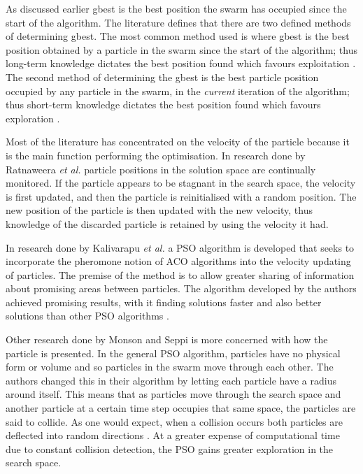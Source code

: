 As discussed earlier gbest is the best position the swarm has occupied since the start of the algorithm. The literature defines that there are two defined methods of determining gbest. The most common method used is where gbest is the best position obtained by a particle in the swarm since the start of the algorithm; thus long-term knowledge dictates the best position found which favours exploitation \cite{CompuIntelligenceIntro,FundamentalSwarm}.
The second method of determining the gbest is the best particle position occupied by any particle in the swarm, in the \emph{current} iteration of the algorithm; thus short-term knowledge dictates the best position found which favours exploration \cite{CompuIntelligenceIntro,FundamentalSwarm}.

Most of the literature has concentrated on the velocity of the particle because it is the main function performing the optimisation. In research done by Ratnaweera \emph{et al.}\cite{PSOSelfHierarch} particle positions in the solution space are continually monitored. If the particle appears to be stagnant in the search space, the velocity is first updated, and then the particle is reinitialised with a random position. The new position of the particle is then updated with the new velocity, thus knowledge of the discarded particle is retained by using the velocity it had\cite{PSOSelfHierarch}.

In research done by Kalivarapu \emph{et al.} \cite{PSOPheromones} a \gls{PSO} algorithm is developed that seeks to incorporate the pheromone notion of \gls{ACO} algorithms into the velocity updating of particles. The premise of the method is to allow greater sharing of information about promising areas between particles. The algorithm developed by the authors achieved promising results, with it finding solutions faster and also better solutions than other \gls{PSO} algorithms \cite{PSOPheromones}. 

Other research done by Monson and Seppi \cite{adaptPSO} is more concerned with how the particle is presented. In the general \gls{PSO} algorithm, particles have no physical form or volume and so particles in the swarm move through each other. The authors changed this in their algorithm by letting each particle have a radius around itself. This means that as particles move through the search space and another particle at a certain time step occupies that same space, the particles are said to collide. As one would expect, when a collision occurs both particles are deflected into random directions \cite{adaptPSO}. At a greater expense of computational time due to constant collision detection, the \gls{PSO} gains greater exploration in the search space. 

